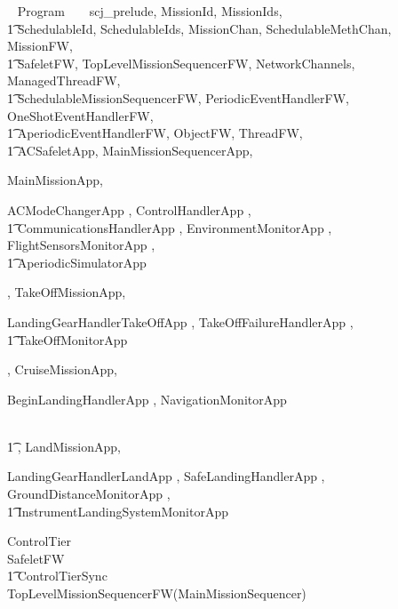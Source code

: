 
%
\begin{zsection}
  \SECTION ~ Program ~ \parents ~ scj\_prelude, MissionId, MissionIds, \\
  \t1 SchedulableId, SchedulableIds, MissionChan, SchedulableMethChan, MissionFW,\\
  \t1 SafeletFW, TopLevelMissionSequencerFW, NetworkChannels, ManagedThreadFW, \\
  \t1 SchedulableMissionSequencerFW, PeriodicEventHandlerFW, OneShotEventHandlerFW,\\
  \t1 AperiodicEventHandlerFW, ObjectFW, ThreadFW, \\
  \t1 ACSafeletApp, MainMissionSequencerApp,

MainMissionApp,

ACModeChangerApp
	,
ControlHandlerApp
	,
\\ \t1
CommunicationsHandlerApp
	,
EnvironmentMonitorApp
	,
FlightSensorsMonitorApp
	,
\\ \t1
AperiodicSimulatorApp
	
	
	,
TakeOffMissionApp,

LandingGearHandlerTakeOffApp
	,
TakeOffFailureHandlerApp
	,
\\ \t1
TakeOffMonitorApp
	
	,
CruiseMissionApp,

BeginLandingHandlerApp
	,
NavigationMonitorApp
	
\\ \t1
	,
LandMissionApp,

LandingGearHandlerLandApp
	,
SafeLandingHandlerApp
	,
GroundDistanceMonitorApp
	,
\\ \t1
InstrumentLandingSystemMonitorApp
	
	
	
\end{zsection}
%
\begin{circus}
\circprocess ControlTier \circdef \\
\circblockopen
SafeletFW \\
\t1 \lpar ControlTierSync \rpar \\
TopLevelMissionSequencerFW(MainMissionSequencer)
\circblockclose
\end{circus}
%


